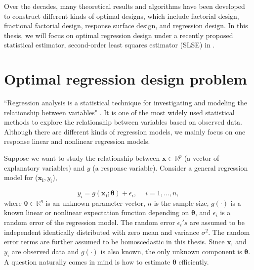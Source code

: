 \documentclass[
]{book}
\theoremstyle{definition}
\theoremstyle{definition}
\theoremstyle{definition}
\theoremstyle{definition}
\theoremstyle{remark}
\begin{document}
Over the decades, many theoretical results and algorithms have been developed to construct different kinds of optimal designs, which include factorial design, fractional factorial design, response surface design, and regression design. In this thesis, we will focus on optimal regression design under a recently proposed statistical estimator, second-order least squares estimator (SLSE) in \citet{wang2008second}.

\hypertarget{optimal-regression-design-problem}{%
\section{Optimal regression design problem}\label{optimal-regression-design-problem}}

``Regression analysis is a statistical technique for investigating and modeling the relationship between variables" \citep{montgomery2012introduction}. It is one of the most widely used statistical methods to explore the relationship between variables based on observed data. Although there are different kinds of regression models, we mainly focus on one response linear and nonlinear regression models.

Suppose we want to study the relationship between \(\boldsymbol{x}\in \mathbb{R}^p\) (a vector of explanatory variables) and \(y\) (a response variable). Consider a general regression model for (\(\boldsymbol{x_i},y_i\)),

\begin{equation}
y_i=g\left(\boldsymbol{x_i};\boldsymbol{\theta}\right)+\epsilon_i,\quad ~i=1,\dots,n,
\label{eq:simple-regression}
\end{equation}
where \(\boldsymbol{\theta}\in \mathbb{R}^q\) is an unknown parameter vector, \(n\) is the sample size, \(g(\cdot)\) is a known linear or nonlinear expectation function depending on \(\boldsymbol{\theta}\), and \(\epsilon_i\) is a random error of the regression model. The random error \(\epsilon_i's\) are assumed to be independent identically distributed with zero mean and variance \(\sigma^2\). The random error terms are further assumed to be homoscedastic in this thesis. Since \(\boldsymbol{x_i}\) and \(y_i\) are observed data and \(g(\cdot)\) is also known, the only unknown component is \(\boldsymbol{\theta}\). A question naturally comes in mind is how to estimate \(\boldsymbol{\theta}\) efficiently.
\end{document}
